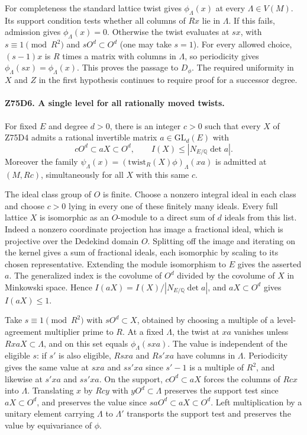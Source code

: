 For completeness the standard lattice twist gives $\phi_\Lambda(x)$
at every $\Lambda\in V(M)$. Its support condition tests whether all
columns of $Rx$ lie in $\Lambda$. If this fails, admission gives
$\phi_\Lambda(x)=0$. Otherwise the twist evaluates at $sx$, with
$s\equiv1\pmod{R^2}$ and $sO^d\subset O^d$ (one may take $s=1$).
For every allowed choice, $(s-1)x$ is $R$ times a matrix with
columns in $\Lambda$, so periodicity gives $\phi_\Lambda(sx)=
\phi_\Lambda(x)$. This proves the passage to $D_\phi$.
The required uniformity in $X$ and $Z$ in the first hypothesis
continues to require proof for a successor degree.

\paragraph{Z75D6. A single level for all rationally moved twists.}
For fixed $E$ and degree $d>0$, there is an integer $c>0$
such that every $X$ of Z75D4 admits a rational invertible matrix
$a\in\mathrm{GL}_d(E)$ with
\[
 cO^d\subset aX\subset O^d,\qquad
 I(X)\le |N_{E/\mathbb Q}\det a|.
\]
Moreover the family $\psi_\Lambda(x)=(\mathrm{twist}_R(X)\phi)_\Lambda(xa)$
is admitted at $(M,Rc)$, simultaneously for all $X$ with this same $c$.

The ideal class group of $O$ is finite. Choose a nonzero integral
ideal in each class and choose $c>0$ lying in every one of these
finitely many ideals. Every full lattice $X$ is isomorphic as an
$O$-module to a direct sum of $d$ ideals from this list. Indeed a
nonzero coordinate projection has image a fractional ideal, which
is projective over the Dedekind domain $O$. Splitting off the image
and iterating on the kernel gives a sum of fractional ideals, each
isomorphic by scaling to its chosen representative. Extending the
module isomorphism to $E$ gives the asserted $a$. The generalized
index is the covolume of $O^d$ divided by the covolume of $X$ in
Minkowski space. Hence $I(aX)=I(X)/|N_{E/\mathbb Q}\det a|$,
and $aX\subset O^d$ gives $I(aX)\le1$.

Take $s\equiv1\pmod{R^2}$ with $sO^d\subset X$, obtained by choosing
a multiple of a level-agreement multiplier prime to $R$.
At a fixed $\Lambda$, the twist at $xa$ vanishes unless
$RxaX\subset\Lambda$, and on this set equals $\phi_\Lambda(sxa)$.
The value is independent of the eligible $s$: if $s'$ is also
eligible, $Rsxa$ and $Rs'xa$ have columns in $\Lambda$. Periodicity
gives the same value at $sxa$ and $ss'xa$ since $s'-1$ is a
multiple of $R^2$, and likewise at $s'xa$ and $ss'xa$.
On the support, $cO^d\subset aX$ forces the columns of $Rcx$ into
$\Lambda$. Translating $x$ by $Rcy$ with $yO^d\subset\Lambda$
preserves the support test since $aX\subset O^d$, and preserves the
value since $saO^d\subset aX\subset O^d$. Left multiplication
by a unitary element carrying $\Lambda$ to $\Lambda'$ transports
the support test and preserves the value by equivariance of $\phi$.


